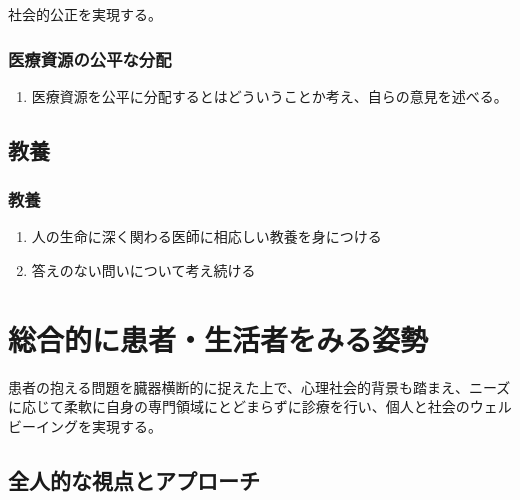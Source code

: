 社会的公正を実現する。

\hypertarget{ux533bux7642ux8cc7ux6e90ux306eux516cux5e73ux306aux5206ux914d}{%
\subsubsection{医療資源の公平な分配}\label{ux533bux7642ux8cc7ux6e90ux306eux516cux5e73ux306aux5206ux914d}}

\begin{enumerate}
\def\labelenumi{\arabic{enumi}.}
\tightlist
\item
  医療資源を公平に分配するとはどういうことか考え、自らの意見を述べる。
\end{enumerate}

\hypertarget{ux6559ux990a}{%
\subsection{教養}\label{ux6559ux990a}}

\hypertarget{ux6559ux990a-1}{%
\subsubsection{教養}\label{ux6559ux990a-1}}

\begin{enumerate}
\def\labelenumi{\arabic{enumi}.}
\tightlist
\item
  人の生命に深く関わる医師に相応しい教養を身につける
\item
  答えのない問いについて考え続ける
\end{enumerate}

\newpage

\hypertarget{ux7dcfux5408ux7684ux306bux60a3ux8005ux751fux6d3bux8005ux3092ux307fux308bux59ffux52e2}{%
\section{総合的に患者・生活者をみる姿勢}\label{ux7dcfux5408ux7684ux306bux60a3ux8005ux751fux6d3bux8005ux3092ux307fux308bux59ffux52e2}}

患者の抱える問題を臓器横断的に捉えた上で、心理社会的背景も踏まえ、ニーズに応じて柔軟に自身の専門領域にとどまらずに診療を行い、個人と社会のウェルビーイングを実現する。

\hypertarget{ux5168ux4ebaux7684ux306aux8996ux70b9ux3068ux30a2ux30d7ux30edux30fcux30c1}{%
\subsection{全人的な視点とアプローチ}\label{ux5168ux4ebaux7684ux306aux8996ux70b9ux3068ux30a2ux30d7ux30edux30fcux30c1}}

